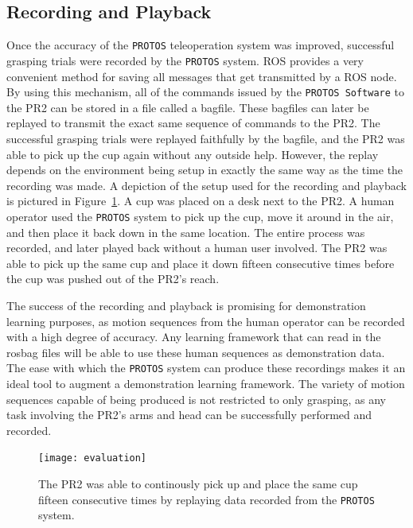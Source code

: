 \documentclass{sig-alternate}
\begin{document}
\subsection{Recording and Playback}
\indent Once the accuracy of the {\tt PROTOS} teleoperation system was improved, successful grasping trials were recorded by the {\tt PROTOS} system. ROS provides a very
convenient method for saving all messages that get transmitted by a ROS node. By using this mechanism, all of the commands issued by the {\tt PROTOS Software} to the PR2
can be stored in a file called a bagfile. These bagfiles can later be replayed to transmit the exact same sequence of commands to the PR2. The successful grasping trials
were replayed faithfully by the bagfile, and the PR2 was able to pick up the cup again without any outside help. However, the replay depends on the environment being setup
in exactly the same way as the time the recording was made. A depiction of the setup used for the recording and playback is pictured in Figure~\ref{fig:evaluation}. A cup
was placed on a desk next to the PR2. A human operator used the {\tt PROTOS} system to pick up the cup, move it around in the air, and then place it back down in the same location.
The entire process was recorded, and later played back without a human user involved. The PR2 was able to pick up the same cup and place it down fifteen consecutive times
before the cup was pushed out of the PR2's reach.

\indent The success of the recording and playback is promising for demonstration learning purposes, as motion sequences from the
 human operator can be recorded with a high degree of
accuracy. Any learning framework that can read in the rosbag files will be able to use these human sequences as demonstration data. The ease with which the {\tt PROTOS} system can 
produce these recordings makes it an ideal tool to augment a demonstration learning framework. The variety of motion sequences capable of being produced is not restricted
to only grasping, as any task involving the PR2's arms and head can be successfully performed and recorded.

\begin{figure}[htb] 
	\begin{center}
		\texttt{[image: evaluation]}
	\end{center}
	\caption{The PR2 was able to continously pick up and place the same cup fifteen consecutive times by replaying data recorded from the {\tt PROTOS} system.}
	\label{fig:evaluation}
\end{figure}
\end{document}
